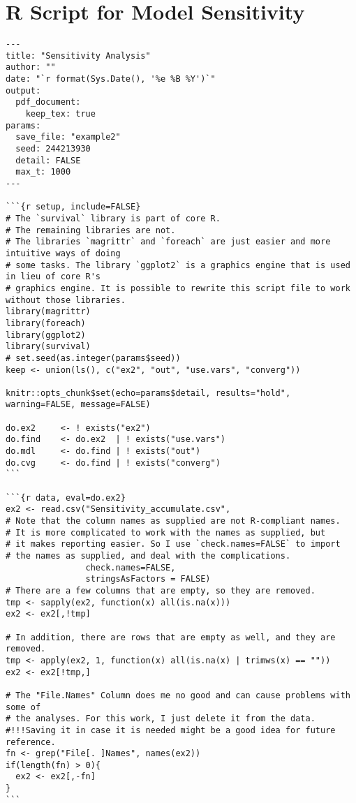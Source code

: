 \section{R Script for Model Sensitivity}
\label{rscript-model-sensitivity}
\vspace{\baselineskip}
\begin{lstlisting}[basicstyle=\scriptsize]
---
title: "Sensitivity Analysis"
author: ""
date: "`r format(Sys.Date(), '%e %B %Y')`"
output:
  pdf_document:
    keep_tex: true
params:
  save_file: "example2"
  seed: 244213930
  detail: FALSE
  max_t: 1000
---

```{r setup, include=FALSE}
# The `survival` library is part of core R.
# The remaining libraries are not.
# The libraries `magrittr` and `foreach` are just easier and more intuitive ways of doing
# some tasks. The library `ggplot2` is a graphics engine that is used in lieu of core R's
# graphics engine. It is possible to rewrite this script file to work without those libraries.
library(magrittr)
library(foreach)
library(ggplot2)
library(survival)
# set.seed(as.integer(params$seed))
keep <- union(ls(), c("ex2", "out", "use.vars", "converg"))

knitr::opts_chunk$set(echo=params$detail, results="hold", warning=FALSE, message=FALSE)

do.ex2     <- ! exists("ex2")
do.find    <- do.ex2  | ! exists("use.vars")
do.mdl     <- do.find | ! exists("out")
do.cvg     <- do.find | ! exists("converg")
```

```{r data, eval=do.ex2}
ex2 <- read.csv("Sensitivity_accumulate.csv",
# Note that the column names as supplied are not R-compliant names.
# It is more complicated to work with the names as supplied, but
# it makes reporting easier. So I use `check.names=FALSE` to import
# the names as supplied, and deal with the complications.
                check.names=FALSE,
                stringsAsFactors = FALSE)
# There are a few columns that are empty, so they are removed.
tmp <- sapply(ex2, function(x) all(is.na(x)))
ex2 <- ex2[,!tmp]

# In addition, there are rows that are empty as well, and they are removed.
tmp <- apply(ex2, 1, function(x) all(is.na(x) | trimws(x) == ""))
ex2 <- ex2[!tmp,]

# The "File.Names" Column does me no good and can cause problems with some of
# the analyses. For this work, I just delete it from the data.
#!!!Saving it in case it is needed might be a good idea for future reference.
fn <- grep("File[. ]Names", names(ex2))
if(length(fn) > 0){
  ex2 <- ex2[,-fn]
}
```


\end{lstlisting}
